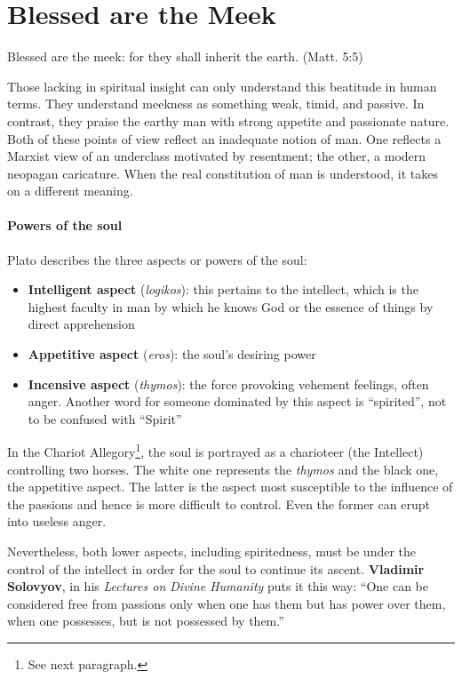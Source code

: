 \section{Blessed are the Meek}

\begin{quotex}
Blessed are the meek: for they shall inherit the earth. (Matt. 5:5)
\end{quotex}

Those lacking in spiritual insight can only understand this beatitude in human terms. They understand meekness as something weak, timid, and passive. In contrast, they praise the earthy man with strong appetite and passionate nature. Both of these points of view reflect an inadequate notion of man. One reflects a Marxist view of an underclass motivated by resentment; the other, a modern neopagan caricature. When the real constitution of man is understood, it takes on a different meaning.

\paragraph{Powers of the soul}


Plato describes the three aspects or powers of the soul:

\begin{itemize}


\item \textbf{Intelligent aspect} (\emph{logikos}): this pertains to the intellect, which is the highest faculty in man by which he knows God or the essence of things by direct apprehension

\item \textbf{Appetitive aspect} (\emph{eros}): the soul's desiring power


\item \textbf{Incensive aspect} (\emph{thymos}): the force provoking vehement feelings, often anger. Another word for someone dominated by this aspect is ``spirited'', not to be confused with ``Spirit''
\end{itemize}


In the Chariot Allegory\footnote{See next paragraph.}, the soul is portrayed as a charioteer (the Intellect) controlling two horses. The white one represents the \emph{thymos} and the black one, the appetitive aspect. The latter is the aspect most susceptible to the influence of the passions and hence is more difficult to control. Even the former can erupt into useless anger.

Nevertheless, both lower aspects, including spiritedness, must be under the control of the intellect in order for the soul to continue its ascent. \textbf{Vladimir Solovyov}, in his \emph{Lectures on Divine Humanity} puts it this way: ``One can be considered free from passions only when one has them but has power over them, when one possesses, but is not possessed by them.''

